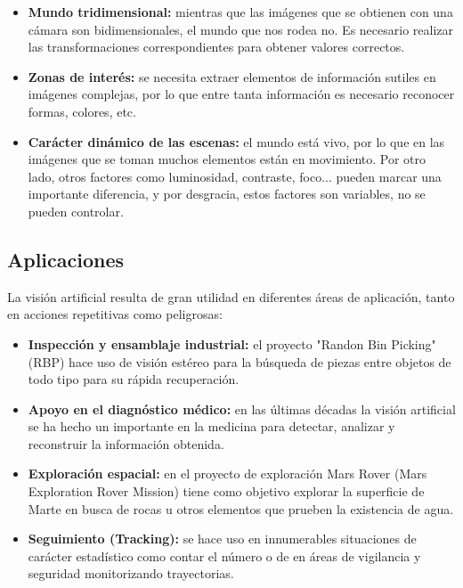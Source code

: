 \begin{itemize}
  \item \textbf{Mundo tridimensional:} mientras que las imágenes que se
  obtienen con una cámara son bidimensionales, el mundo que nos rodea no. Es
  necesario realizar las transformaciones correspondientes para obtener valores
  correctos.
  \item \textbf{Zonas de interés:} se necesita extraer elementos de información 
  sutiles en imágenes complejas, por lo que entre tanta información es
  necesario reconocer formas, colores, etc.
  \item \textbf{Carácter dinámico de las escenas:} el mundo está vivo, por lo
  que en las imágenes que se toman muchos elementos están en movimiento. Por 
  otro lado, otros factores como luminosidad, contraste, foco... pueden marcar
  una importante diferencia, y por desgracia, estos factores son variables, no
  se pueden controlar.
\end{itemize}

\subsection{Aplicaciones}
La visión artificial resulta de gran utilidad en diferentes áreas de
aplicación, tanto en acciones repetitivas como peligrosas:


\begin{itemize}
  \item \textbf{Inspección y ensamblaje industrial:} el proyecto "Randon Bin
  Picking" (RBP) hace uso de visión estéreo para la búsqueda de piezas entre
  objetos de todo tipo para su rápida recuperación.
  \item \textbf{Apoyo en el diagnóstico médico:} en las últimas décadas la
  visión artificial se ha hecho un importante en la medicina para detectar,
  analizar y reconstruir la información obtenida.
  \item \textbf{Exploración espacial:} en el proyecto de exploración Mars Rover
  (Mars Exploration Rover Mission) tiene como objetivo explorar la superficie
  de Marte en busca de rocas u otros elementos que prueben la existencia de
  agua.
  \item \textbf{Seguimiento (Tracking):} se hace uso en innumerables
  situaciones de carácter estadístico como contar el número o de en áreas de
  vigilancia y seguridad monitorizando trayectorias.
\end{itemize}

